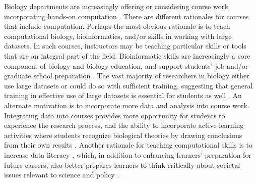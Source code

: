 Biology departments are increasingly offering or considering course work incorporating hands-on computation
\citep{WilsonSayres18}. 
There are different rationales for courses that include computation.
Perhaps the most obvious rationale is to teach computational biology, bioinformatics,
and/or skills in working with large datasets.
In such courses, instructors may be teaching particular skills or tools that are an integral part of the field.
Bioinformatic skills are increasingly a core component of biology and biology education, and 
support students' job and/or graduate school preparation \citep{WilsonSayres18}. 
The vast majority of researchers in biology either use large datasets or could do so with sufficient training, suggesting that general training in effective use of large datasets is essential for students as well \citep{Barone17,Loman13}.
An alternate motivation is to incorporate more data and analysis into course work.
Integrating data into courses provides more opportunity for students to experience the research process, and the ability to incorporate active learning activities where
students recognize biological theories by drawing conclusions from their own results
\citep{Kjelvik19}.
Another rationale for teaching computational skills is to increase data literacy \citep{Gibson18}, which, in addition to enhancing learners' preparation for future careers, also better prepares learners to think critically about societal issues relevant to science and policy \citep{cook2014}.

